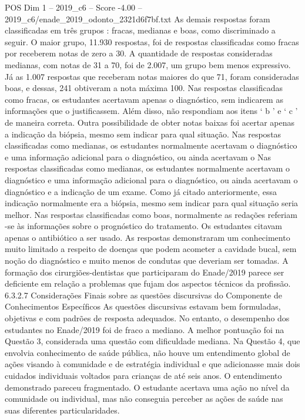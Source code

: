 \begin{textsample}{POS Dim 1 – 2019\_c6 – Score -4.00 – 2019\_c6/enade\_2019\_odonto\_2321d6f7bf.txt}
As demais respostas foram classificadas em três grupos : fracas, medianas e boas, como discriminado a seguir.
O maior grupo, 11.930 respostas, foi de respostas classificadas como fracas por receberem notas de zero a 30.
A quantidade de respostas consideradas medianas, com notas de 31 a 70, foi de 2.007, um grupo bem menos expressivo.
Já as 1.007 respostas que receberam notas maiores do que 71, foram consideradas boas, e dessas, 241 obtiveram a nota máxima 100.
Nas respostas classificadas como fracas, os estudantes acertavam apenas o diagnóstico, sem indicarem as informações que o justificassem.
Além disso, não respondiam aos itens ‘ b ’ e ‘ c ’ de maneira correta.
Outra possibilidade de obter notas baixas foi acertar apenas a indicação da biópsia, mesmo sem indicar para qual situação.
Nas respostas classificadas como medianas, os estudantes normalmente acertavam o diagnóstico e uma informação adicional para o diagnóstico, ou ainda acertavam o Nas respostas classificadas como medianas, os estudantes normalmente acertavam o diagnóstico e uma informação adicional para o diagnóstico, ou ainda acertavam o diagnóstico e a indicação de um exame.
Como já citado anteriormente, essa indicação normalmente era a biópsia, mesmo sem indicar para qual situação seria melhor.
Nas respostas classificadas como boas, normalmente as redações referiam -se às informações sobre o prognóstico do tratamento.
Os estudantes citavam apenas o antibiótico a ser usado.
As respostas demonstraram um conhecimento muito limitado a respeito de doenças que podem acometer a cavidade bucal, sem noção do diagnóstico e muito menos de condutas que deveriam ser tomadas.
A formação dos cirurgiões-dentistas que participaram do Enade/2019 parece ser deficiente em relação a problemas que fujam dos aspectos técnicos da profissão. 6.3.2.7 Considerações Finais sobre as questões discursivas do Componente de Conhecimentos Específicos As questões discursivas estavam bem formuladas, objetivas e com padrões de resposta adequados.
No entanto, o desempenho dos estudantes no Enade/2019 foi de fraco a mediano.
A melhor pontuação foi na Questão 3, considerada uma questão com dificuldade mediana.
Na Questão 4, que envolvia conhecimento de saúde pública, não houve um entendimento global de ações visando à comunidade e de estratégia individual e que adicionasse mais dois cuidados individuais voltados para crianças de até seis anos.
O entendimento demonstrado pareceu fragmentado.
O estudante acertava uma ação no nível da comunidade ou individual, mas não conseguia perceber as ações de saúde nas suas diferentes particularidades.

\end{textsample}
